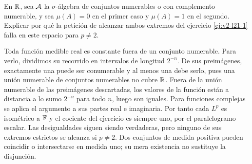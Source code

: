 \begin{ejercicio}\label{ej:v2-l21-4}
En $\mathbb R$, sea $\mathcal A$ la $\sigma$-álgebra de conjuntos numerables o con complemento numerable, y sea $\mu(A)=0$ en el primer caso y $\mu(A)=1$ en el segundo. Explicar por qué la petición de alcanzar ambos extremos del ejercicio \ref{ej:v2-l21-1} falla en este espacio para $p\ne2$.
\end{ejercicio}
\begin{solucion}
Toda función medible real es constante fuera de un conjunto numerable. Para verlo, dividimos su recorrido en intervalos de longitud $2^{-n}$. De sus preimágenes, exactamente una puede ser conumerable y al menos una debe serlo, pues una unión numerable de conjuntos numerables no cubre $\mathbb R$. Fuera de la unión numerable de las preimágenes descartadas, los valores de la función están a distancia a lo sumo $2^{-n}$ para todo $n$, luego son iguales. Para funciones complejas se aplica el argumento a sus partes real e imaginaria. Por tanto cada $L^p$ es isométrico a $\mathbb F$ y el cociente del ejercicio es siempre uno, por el paralelogramo escalar. Las desigualdades siguen siendo verdaderas, pero ninguno de sus extremos estrictos se alcanza si $p\ne2$. Dos conjuntos de medida positiva pueden coincidir o intersectarse en medida uno; su mera existencia no sustituye la disjunción.
\end{solucion}

